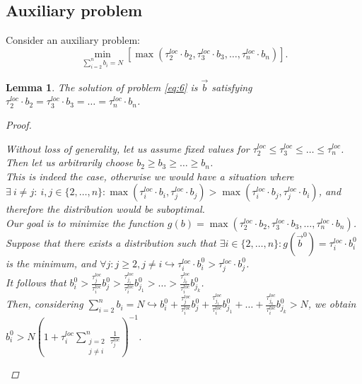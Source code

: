 \documentclass{article}
\newtheorem{lemma}[theorem]{Lemma}
\begin{document}
\subsection{Auxiliary problem}
Consider an auxiliary problem:
\begin{equation}
    \label{eq:6}
    \underset{\sum\limits_{i = 2}^{n} b_i = N}{\min} [\max(\tau_2^{loc}\cdot b_2, \tau_3^{loc}\cdot b_3, \ldots, \tau_n^{loc}\cdot b_n)].
\end{equation}


\begin{lemma}
    \label{l1}
    The solution of problem \eqref{eq:6} is $\overrightarrow{b}$ satisfying $\tau_2^{loc}\cdot b_2 = \tau_3^{loc}\cdot b_3 = \ldots = \tau_n^{loc}\cdot b_n$.
    \begin{proof}
        \begin{spacing}{1.35}
        
        Without loss of generality, let us assume fixed values for $\tau_2^{loc}\leq \tau_3^{loc}\leq \ldots \leq \tau_n^{loc}$. \\
        Then let us arbitrarily choose $b_2\geq b_3\geq \ldots \geq b_n$.
        \\
        This is indeed the case, otherwise we would have a situation where $\exists ~ i \neq j: ~ i, j\in \{2, \ldots, n\} : \max(\tau_i^{loc}\cdot b_i, \tau_j^{loc}\cdot b_j) > \max(\tau_i^{loc}\cdot b_j, \tau_j^{loc}\cdot b_i)$, and therefore the distribution would be suboptimal. 
        \\
        Our goal is to minimize the function $g(b) = \max(\tau_2^{loc}\cdot b_2, \tau_3^{loc}\cdot b_3, \ldots, \tau_n^{loc}\cdot b_n)$. 
        \\
        Suppose that there exists a distribution such that $\exists i \in \{2, \ldots, n\}: g(\overrightarrow{b}^0) = \tau_i^{loc}\cdot b_i^0$ is the minimum, and $\forall j: j \geq 2, j \neq i \hookrightarrow \tau_i^{loc}\cdot b_i^0 > \tau_j^{loc}\cdot b_j^0$. 
        \\
        It follows that $b_i^0 > \frac{\tau_j^{loc}}{\tau_i^{loc}}b_j^0 > \frac{\tau_{j_1}^{loc}}{\tau_i^{loc}}b_{j_1}^0 > \ldots > \frac{\tau_{j_k}^{loc}}{\tau_i^{loc}}b_{j_k}^0$. 
        \\
        Then, considering $\sum\limits_{i = 2}^n b_i = N \hookrightarrow b_i^0 + \frac{\tau_j^{loc}}{\tau_i^{loc}}b_j^0 + \frac{\tau_{j_1}^{loc}}{\tau_i^{loc}}b_{j_1}^0 + \ldots + \frac{\tau_{j_k}^{loc}}{\tau_i^{loc}}b_{j_k}^0 > N$,
        we obtain 
        \\
        $b_i^0 > N(1 + \tau_i^{loc}\sum\limits_{\substack{j = 2 \\ j \neq i}}^n \frac{1}{\tau_j^{loc}})^{-1}$.
        

\end{spacing}
\end{proof}
\end{lemma}
\end{document}
